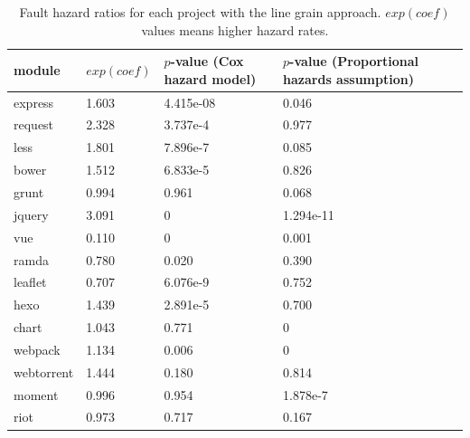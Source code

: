 \documentclass[smallcondensed]{svjour3}
\begin{document}
\begin{table}[t]
	\centering
	\scriptsize
	\caption{Fault hazard ratios for each project with the line grain approach. $exp(coef)$ values means higher hazard rates.}
	\label{hazardlinegrain}
	\begin{tabular}{l|l|l|l}
		\hline
		module & $exp(coef)$ & $p$-value (Cox hazard model) & $p$-value (Proportional hazards assumption)     \\ \hline
		express  & 1.603 & 4.415e-08 & 0.046 \\ \hline
		request  & 2.328 & 3.737e-4 & 0.977 \\ \hline
		less  & 1.801 & 7.896e-7 & 0.085 \\ \hline
		bower	 & 1.512 & 6.833e-5 & 0.826 \\ \hline
		grunt    & 0.994 & 0.961 & 0.068 \\ \hline
		jquery	 & 3.091 & 0 & 1.294e-11 \\ \hline
		vue   & 0.110 & 0 & 0.001 \\ \hline
		ramda 	 & 0.780 & 0.020 & 0.390 \\ \hline
		leaflet	 & 0.707 & 6.076e-9 & 0.752 \\ \hline
		hexo	 & 1.439 & 2.891e-5 & 0.700 \\ \hline
		chart	 & 1.043 & 0.771 & 0 \\ \hline
		webpack	 & 1.134 & 0.006 & 0 \\ \hline
		webtorrent & 1.444 & 0.180 & 0.814 \\ \hline
		moment	 & 0.996 & 0.954 & 1.878e-7 \\ \hline
		riot	 & 0.973 & 0.717 & 0.167 \\ \hline
	\end{tabular}

\end{table}
\end{document}
